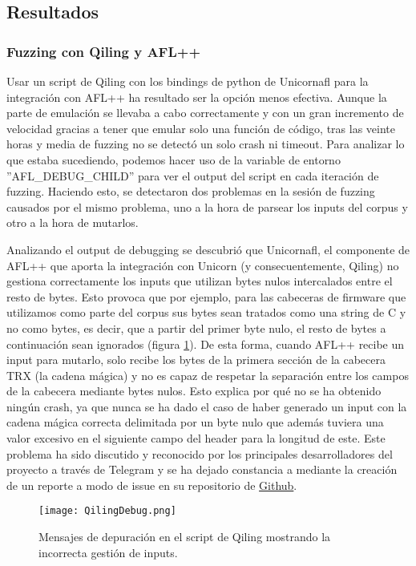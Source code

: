 \subsection{Resultados}
\subsubsection{Fuzzing con Qiling y AFL++}
Usar un script de Qiling con los bindings de python de Unicornafl para la integración con AFL++ ha resultado ser la opción menos efectiva. 
Aunque la parte de emulación se llevaba a cabo correctamente y con un gran incremento de velocidad gracias a tener que emular solo una función de 
código, tras las veinte horas y media de fuzzing no se detectó un solo crash ni timeout. Para analizar lo que estaba sucediendo, podemos hacer 
uso de la variable de entorno ''AFL\_DEBUG\_CHILD'' para ver el output del script en cada iteración de fuzzing. Haciendo esto, se detectaron dos 
problemas en la sesión de fuzzing causados por el mismo problema, uno a la hora de parsear los inputs del corpus y otro a la hora de mutarlos.\bigskip

Analizando el output de debugging se descubrió que Unicornafl, el componente de AFL++ que 
aporta la integración con Unicorn (y consecuentemente, Qiling) no gestiona correctamente los inputs que utilizan bytes nulos intercalados 
entre el resto de bytes. Esto provoca que por ejemplo, para las cabeceras de firmware que utilizamos como parte del corpus sus bytes sean 
tratados como una string de C y no como bytes, es decir, que a partir del primer byte nulo, el resto de bytes a continuación sean ignorados 
(figura \ref{fig:QilingDebug}). De esta forma, cuando AFL++ recibe un input para mutarlo, solo recibe los bytes de la primera sección 
de la cabecera TRX (la cadena mágica) y no es capaz 
de respetar la separación entre los campos de la cabecera mediante bytes nulos. Esto explica por qué no se ha obtenido ningún crash, ya que 
nunca se ha dado el caso de haber generado un input con la cadena mágica correcta delimitada por un byte nulo que además tuviera una valor 
excesivo en el siguiente campo del header para la longitud de este. Este problema ha sido discutido y reconocido por los principales 
desarrolladores del proyecto a través de Telegram y se ha dejado constancia a mediante la creación de un reporte a modo de issue en su repositorio
de \href{https://github.com/AFLplusplus/unicornafl/issues/13}{Github}. 
\begin{figure}[H]
    \centering
    \texttt{[image: QilingDebug.png]}
    \caption{Mensajes de depuración en el script de Qiling mostrando la incorrecta gestión de inputs.}
    \label{fig:QilingDebug}
\end{figure}

